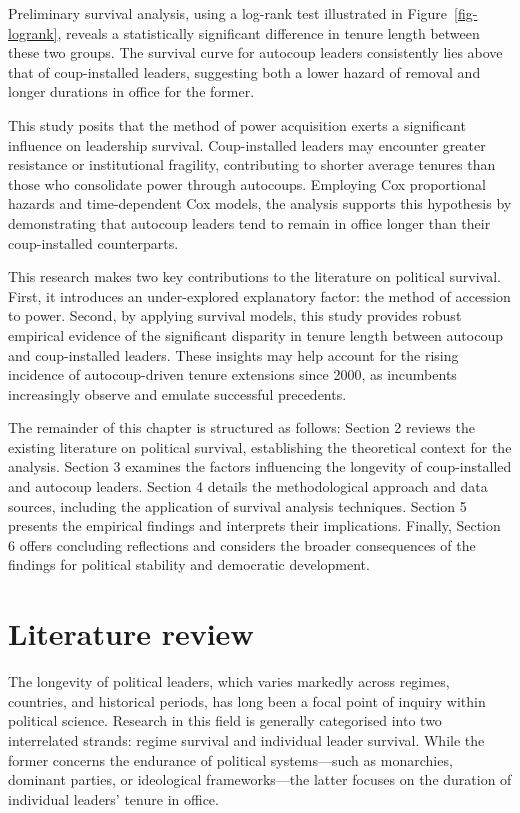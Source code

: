 \documentclass[
  12pt,
]{report}
\begin{document}
Preliminary survival analysis, using a log-rank test illustrated in
Figure~\ref{fig-logrank}, reveals a statistically significant difference
in tenure length between these two groups. The survival curve for
autocoup leaders consistently lies above that of coup-installed leaders,
suggesting both a lower hazard of removal and longer durations in office
for the former.

This study posits that the method of power acquisition exerts a
significant influence on leadership survival. Coup-installed leaders may
encounter greater resistance or institutional fragility, contributing to
shorter average tenures than those who consolidate power through
autocoups. Employing Cox proportional hazards and time-dependent Cox
models, the analysis supports this hypothesis by demonstrating that
autocoup leaders tend to remain in office longer than their
coup-installed counterparts.

This research makes two key contributions to the literature on political
survival. First, it introduces an under-explored explanatory factor: the
method of accession to power. Second, by applying survival models, this
study provides robust empirical evidence of the significant disparity in
tenure length between autocoup and coup-installed leaders. These
insights may help account for the rising incidence of autocoup-driven
tenure extensions since 2000, as incumbents increasingly observe and
emulate successful precedents.

The remainder of this chapter is structured as follows: Section 2
reviews the existing literature on political survival, establishing the
theoretical context for the analysis. Section 3 examines the factors
influencing the longevity of coup-installed and autocoup leaders.
Section 4 details the methodological approach and data sources,
including the application of survival analysis techniques. Section 5
presents the empirical findings and interprets their implications.
Finally, Section 6 offers concluding reflections and considers the
broader consequences of the findings for political stability and
democratic development.

\section{Literature review}\label{literature-review}

The longevity of political leaders, which varies markedly across
regimes, countries, and historical periods, has long been a focal point
of inquiry within political science. Research in this field is generally
categorised into two interrelated strands: regime survival and
individual leader survival. While the former concerns the endurance of
political systems---such as monarchies, dominant parties, or ideological
frameworks---the latter focuses on the duration of individual leaders'
tenure in office.
\end{document}
